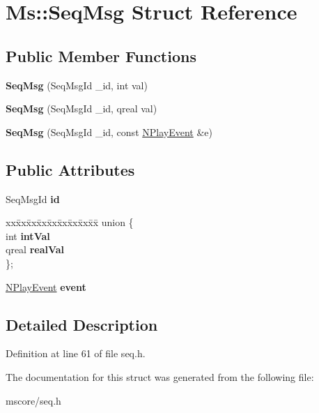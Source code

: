 \hypertarget{struct_ms_1_1_seq_msg}{}\section{Ms\+:\+:Seq\+Msg Struct Reference}
\label{struct_ms_1_1_seq_msg}
\subsection*{Public Member Functions}
\begin{DoxyCompactItemize}
\item 
\mbox{\label{struct_ms_1_1_seq_msg_ad22e54b0a09b2283119658439f579aa4}} 
{\bfseries Seq\+Msg} (Seq\+Msg\+Id \+\_\+id, int val)
\item 
\mbox{\label{struct_ms_1_1_seq_msg_acaabb7d4ee6a27c3a4e3a60d1f0ac5dc}} 
{\bfseries Seq\+Msg} (Seq\+Msg\+Id \+\_\+id, qreal val)
\item 
\mbox{\label{struct_ms_1_1_seq_msg_ac1765993ed99548e6b25ee5a32eb59c8}} 
{\bfseries Seq\+Msg} (Seq\+Msg\+Id \+\_\+id, const \hyperlink{class_ms_1_1_n_play_event}{N\+Play\+Event} \&e)
\end{DoxyCompactItemize}
\subsection*{Public Attributes}
\begin{DoxyCompactItemize}
\item 
\mbox{\label{struct_ms_1_1_seq_msg_a91f06bdef65a94172e02cc2341f0aac1}} 
Seq\+Msg\+Id {\bfseries id}
\item 
\mbox{\label{struct_ms_1_1_seq_msg_a929eeb1bbb9aa3c28bca633951977f87}} 
\begin{tabbing}
xx\=xx\=xx\=xx\=xx\=xx\=xx\=xx\=xx\=\kill
union \{\\
\>int {\bfseries intVal}\\
\>qreal {\bfseries realVal}\\
\}; \\

\end{tabbing}\item 
\mbox{\label{struct_ms_1_1_seq_msg_ac09a8eb96617a08ff960c13bf0b52cdb}} 
\hyperlink{class_ms_1_1_n_play_event}{N\+Play\+Event} {\bfseries event}
\end{DoxyCompactItemize}


\subsection{Detailed Description}


Definition at line 61 of file seq.\+h.



The documentation for this struct was generated from the following file\+:\begin{DoxyCompactItemize}
\item 
mscore/seq.\+h\end{DoxyCompactItemize}
